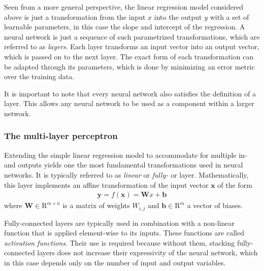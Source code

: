   Seen from a more general perspective, the linear regression model considered
  above is just a transformation from the input $x$ into the output $y$ with a
  set of learnable parameters, in this case the slope and intercept of the
  regression. A neural network is just a sequence of such parametrized
  transformations, which are referred to as \textit{layers}. Each layer
  transforms an input vector into an output vector, which is passed on to the
  next layer. The exact form of each transformation can be adapted through its
  parameters, which is done by minimizing an error metric over the training
  data.

  It is important to note that every neural network also satisfies the
  definition of a layer. This allows any neural network to be used as a
  component within a larger network.


  \subsubsection{The multi-layer perceptron}

  Extending the simple linear regression model to accommodate for multiple in-
  and outputs yields one the most fundamental transformations used in neural
  networks. It is typically referred to as \textit{linear} or \textit{fully-} or
   layer. Mathematically, this layer implements an
  affine transformation of the input vector $\bm{x}$ of the form
  \begin{align}
    \bm{y} = f(\bm{x}) = \bm{W}x + \bm{b}
  \end{align}
  where $\bm{W} \in \mathrm{R}^{m \times n}$ is a matrix of weights $W_{i,j}$
  and $\bm{b} \in \mathrm{R}^m$ a vector of  biases.

  Fully-connected layers are typically used in combination with a non-linear
  function that is applied element-wise to its inputs. These functions are
  called \textit{activation functions}. Their use is required because without
  them, stacking fully-connected layers does not increase their expressivity of
  the neural network, which in this case depends only on the number of input and
  output variables.

